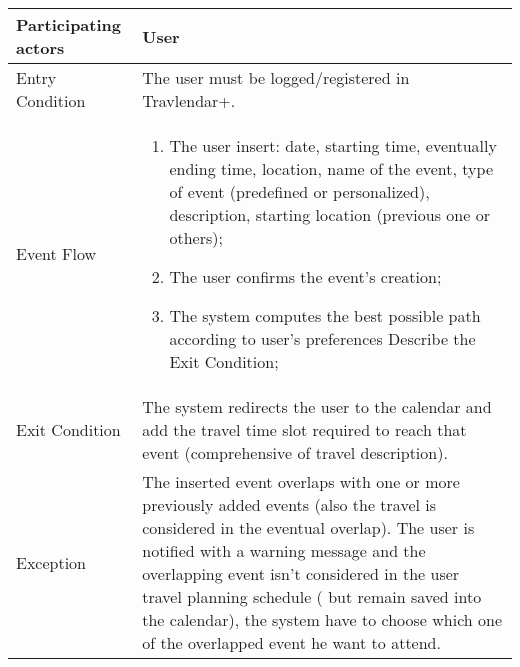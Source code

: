 \begin{table}[H]
	\begin{center}
		\begin{tabular}{ | p{} | p{} | }
		\hline
		Participating actors & User\\
		\hline
		Entry Condition & The user must be logged/registered in Travlendar+.\\
		\hline
		Event Flow & 
			\begin{enumerate}
				\item The user insert: date, starting time, eventually ending time, location, name of the event, type of event (predefined or personalized), description, starting location (previous one or others);
				\item The user confirms the event’s creation;
				\item The system computes the best possible path according to user’s preferences
Describe the Exit Condition;
			\end{enumerate} \\
		\hline
		Exit Condition & The system redirects the user to the calendar and add the travel time slot required to reach that event (comprehensive of travel description). \\
		\hline
		Exception & The inserted event overlaps with one or more previously added events (also the travel is considered in the eventual overlap). The user is notified with a warning message and the overlapping event isn’t considered in the user travel planning schedule ( but remain saved into the calendar), the system have to choose which one of the overlapped event he want to attend.\\ 
		\hline
		\end{tabular}
	\end{center}
\end{table}